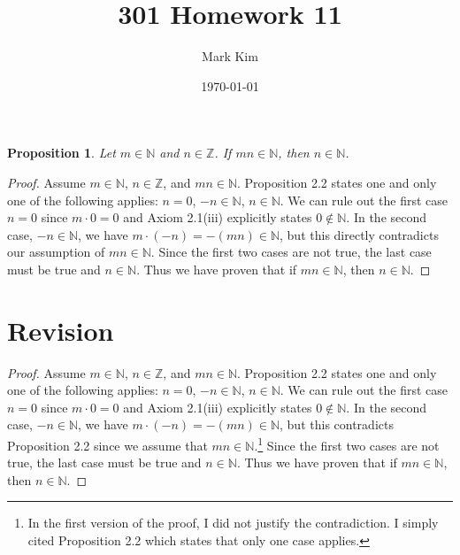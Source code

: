 \documentclass[12pt]{amsart}
\title{301 Homework 11}
\author{Mark Kim}
\date{\today}
\newcommand{\Z}{\mathbb{Z}}
\newcommand{\N}{\mathbb{N}}
\newtheorem*{proposition}{Proposition}
\begin{document}
\maketitle

\begin{proposition}
Let $m\in\N$ and $n\in\Z$. If $mn\in\N$, then $n\in\N$.
\end{proposition}

\begin{proof}
Assume $m\in\N$, $n\in\Z$, and $mn\in\N$.  Proposition 2.2 states one and only one of the following applies: $n=0$, $-n\in\N$, $n\in\N$.  We can rule out the first case $n=0$ since $m\cdot0=0$ and Axiom 2.1(iii) explicitly states $0\notin\N$.  In the second case, $-n\in\N$, we have $m\cdot(-n)=-(mn)\in\N$, but this directly contradicts our assumption of $mn\in\N$.  Since the first two cases are not true, the last case must be true and $n\in\N$.  Thus we have proven that if $mn\in\N$, then $n\in\N$.
\end{proof}

\section*{Revision}

\begin{proof}
Assume $m\in\N$, $n\in\Z$, and $mn\in\N$.  Proposition 2.2 states one and only one of the following applies: $n=0$, $-n\in\N$, $n\in\N$.  We can rule out the first case $n=0$ since $m\cdot0=0$ and Axiom 2.1(iii) explicitly states $0\notin\N$.  In the second case, $-n\in\N$, we have $m\cdot(-n)=-(mn)\in\N$, but this contradicts Proposition 2.2 since we assume that $mn\in\N$.\footnote{In the first version of the proof, I did not justify the contradiction.  I simply cited Proposition 2.2 which states that only one case applies.} Since the first two cases are not true, the last case must be true and $n\in\N$.  Thus we have proven that if $mn\in\N$, then $n\in\N$.
\end{proof}
\end{document}
